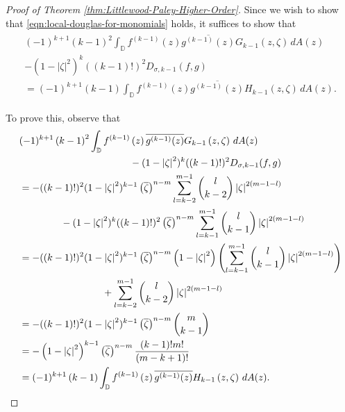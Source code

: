 \documentclass[10pt,oneside,reqno]{amsart}
\theoremstyle{definition}
\theoremstyle{remark}
\newcommand{\abs}[1]{\left\lvert #1 \right\rvert}
\newcommand{\D}{\mathbb D}
\numberwithin{equation}{section}
\begin{document}
\begin{proof}[Proof of Theorem \ref{thm:Littlewood-Paley-Higher-Order}]
    Since we wish to show that \eqref{eqn:local-douglas-for-monomials} holds, it suffices to show that 
    \begin{align*}
    \begin{split}
               (-1)^{k+1} \left( k-1 \right)^{2} \int_{\D} f^{\left( k-1 \right)}\left( z\right) \overline{g^{(k-1)} (z)}   G _{k-1} \left( z, \zeta \right) \, dA(z)
               \\ - (1-\abs{\zeta}^2)^{k} ((k-1)!)^{2} D_{\sigma, k-1} (f,g) \\
         = (-1)^{k+1} \left( k-1 \right) \int_{\D} f^{\left( k-1 \right)}\left( z\right) \overline{g^{(k-1)} (z)}  H_{k-1} \left( z, \zeta \right) \, dA(z).
    \end{split}
    \end{align*}

    To prove this, observe that 
    \begin{align*}
    \begin{split}
         & (-1)^{k+1} \left( k-1 \right)^{2} \int_{\D} f^{\left( k-1 \right)}\left( z\right) \overline{g^{(k-1)} (z)}   G _{k-1} \left( z, \zeta \right) \, dA(z) \\
        & \hspace{40mm} - (1-\abs{\zeta}^2)^{k} ((k-1)!)^{2} D_{\sigma, k-1} (f,g) \\
        & = - ((k-1)!)^2 (1-\abs{\zeta}^2)^{k-1} \left( \overline{\zeta} \right)^{n-m} \sum_{l=k-2}^{m-1} \binom{l}{k-2} \abs{\zeta}^{2\left( m-1-l \right)}  \\ & \hspace{15mm}  - (1-\abs{\zeta}^2)^{k} ((k-1)!)^{2} \left( \overline{\zeta} \right)^{n-m} \sum_{l=k-1}^{m-1} \binom{l}{k-1} \abs{\zeta}^{2\left( m-1-l \right)} \\
        & = -((k-1)!)^{2} (1-\abs{\zeta}^2)^{k-1} \left( \overline{\zeta} \right)^{n-m} \left( 1-\abs{\zeta}^{2} \right) \left( \sum_{l=k-1}^{m-1} \binom{l}{k-1} \abs{\zeta}^{2\left( m-1-l \right)} \right) \\
        & \hspace{30mm} + \sum_{l=k-2}^{m-1} \binom{l}{k-2} \abs{\zeta}^{2\left( m-1-l \right)} \\
        & = -((k-1)!)^{2} (1-\abs{\zeta}^2)^{k-1} \left( \overline{\zeta} \right)^{n-m} \binom{m}{k-1} \\
        &= - \left( 1-\abs{\zeta}^{2} \right)^{k-1} \left( \overline{\zeta} \right)^{n-m} \frac{(k-1)! m!}{(m-k+1)!} \\
        & = (-1)^{k+1} \left( k-1 \right) \int_{\D} f^{\left( k-1 \right)}\left( z\right) \overline{g^{(k-1)} (z)}  H_{k-1} \left( z, \zeta \right) \, dA(z).

\end{split}
\end{align*}
\end{proof}
\end{document}
